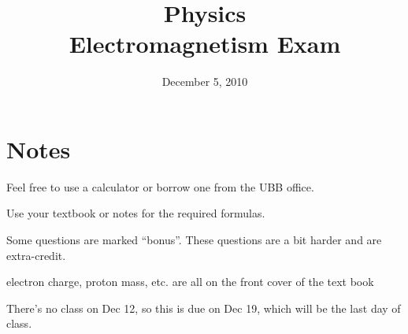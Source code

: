 \documentclass[fleqn,addpoints]{exam}
\title{Physics \\ Electromagnetism Exam}
\date{December 5, 2010}
\begin{document}
\maketitle


\ifprintanswers
\else
\section{Notes}

\begin{itemize*}
  \item Feel free to use a calculator or borrow one from the UBB office.
  \item Use your textbook or notes for the required formulas.
  \item Some questions are marked ``bonus''.  These questions are a bit harder and are extra-credit.
  \item electron charge, proton mass, etc. are all on the front cover of the text book
  \item There's no class on Dec 12, so this is due on Dec 19, which will be the last day of class.
\end{itemize*}

\fi
\end{document}
